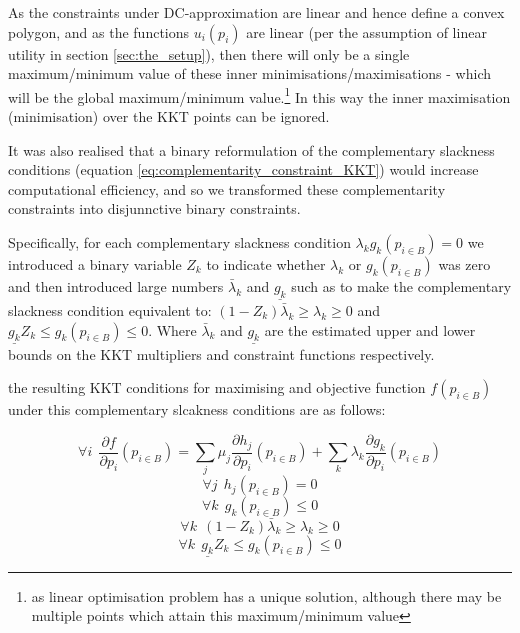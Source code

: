 As the constraints under DC-approximation are linear and hence define a convex polygon,
and as the functions $u_i(p_i)$ are linear (per the assumption of linear utility in section \ref{sec:the_setup}), then there will only be a single maximum/minimum value of these inner minimisations/maximisations - which will be the global maximum/minimum value.\footnote{as linear optimisation problem has a unique solution, although there may be multiple points which attain this maximum/minimum value}
In this way the inner maximisation (minimisation) over the KKT points can be ignored.

It was also realised that a binary reformulation of the complementary slackness conditions (equation \ref{eq:complementarity_constraint_KKT}) would increase computational efficiency, and so we transformed these complementarity constraints into disjunnctive binary constraints.

Specifically, for each complementary slackness condition $\lambda_kg_k(p_{i\in B}) = 0$ we introduced a binary variable $Z_k$ to indicate whether $\lambda_k$ or $g_k(p_{i\in B})$ was zero and then introduced large numbers $\bar{\lambda}_k$ and $ \underline{g_k} $ such as to make the complementary slackness condition equivalent to: $(1-Z_k)\bar{\lambda}_k \ge \lambda_k \ge 0$ and $\underline{g_k}Z_k\le g_k(p_{i\in B})\le 0$.
Where $\bar{\lambda}_k$ and $\underline{g_k}$ are the estimated upper and lower bounds on the KKT multipliers and constraint functions respectively.

the resulting KKT conditions for maximising and objective function $f(p_{i\in B})$ under this complementary slcakness conditions are as follows:

\begin{equation}\forall i~~\frac{\partial f}{\partial p_i}(p_{i\in B})=\sum_j\mu_j\frac{\partial h_j}{\partial p_i}(p_{i\in B}) + \sum_k\lambda_k\frac{\partial g_k}{\partial p_i}(p_{i\in B})\end{equation}
\begin{equation}\forall j~~ h_j(p_{i\in B})=0\end{equation}
\begin{equation}\forall k~~ g_k(p_{i\in B})\le 0\end{equation}
\begin{equation}\forall k~~ (1-Z_k)\bar{\lambda}_k \ge \lambda_k \ge 0\end{equation}
\begin{equation}\forall k~~ \underline{g_k}Z_k\le g_k(p_{i\in B}) \le 0\end{equation}

